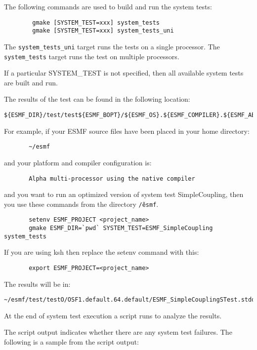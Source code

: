 The following commands are used to build and run the system tests:

\begin{verbatim}
        gmake [SYSTEM_TEST=xxx] system_tests
        gmake [SYSTEM_TEST=xxx] system_tests_uni
\end{verbatim}

The {\tt system\_tests\_uni} target runs the tests on a single processor. 
The {\tt system\_tests} target runs the test on multiple processors.

If a particular SYSTEM\_TEST is not specified, then all available system tests 
are built and run.

The results of the test can be found in the following location:
\begin{verbatim}
${ESMF_DIR}/test/test${ESMF_BOPT}/${ESMF_OS}.${ESMF_COMPILER}.${ESMF_ABI}.${ESMF_SITE}
\end{verbatim}

For example, if your ESMF source files have been placed in your home directory:
\begin{verbatim}
       ~/esmf
\end{verbatim}

and your platform and compiler configuration is:
\begin{verbatim}
       Alpha multi-processor using the native compiler
\end{verbatim}

and you want to run an optimized version of system test SimpleCoupling,
then you use these commands from the directory {\tt \~/esmf}. 
\begin{verbatim}
       setenv ESMF_PROJECT <project_name>
       gmake ESMF_DIR=`pwd` SYSTEM_TEST=ESMF_SimpleCoupling system_tests
\end{verbatim}

If you are using ksh then replace the setenv command with
this:

\begin{verbatim}
       export ESMF_PROJECT=<project_name>
\end{verbatim}

The results will be in:
\begin{verbatim}
~/esmf/test/testO/OSF1.default.64.default/ESMF_SimpleCouplingSTest.stdout
\end{verbatim}

At the end of system test execution a script runs to analyze the results.

The script output indicates whether there are any system test failures.
The following is a sample from the script output:

